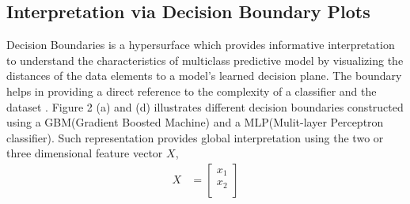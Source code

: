 \documentclass{article}
\begin{document}
\subsection{Interpretation via Decision Boundary Plots}
Decision Boundaries is a hypersurface which provides informative interpretation to understand the characteristics of multiclass predictive model by visualizing the distances of the data elements to a model's learned decision plane. The boundary helps in providing a direct reference to the complexity of a classifier and the dataset \cite{rao1997visualizing} \cite{migut2015visualizing}. Figure 2 (a) and (d) illustrates different decision boundaries constructed using a GBM(Gradient Boosted Machine) and a MLP(Mulit-layer Perceptron classifier).
Such representation provides global interpretation using the two or three dimensional feature vector $X$,
\begin{align}
    X &= \begin{bmatrix}
           x_{1} \\
           x_{2} \\
         \end{bmatrix}
\end{align}
\end{document}
